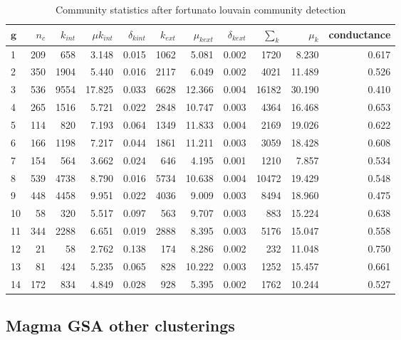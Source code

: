 \begin{table}[ht]
\centering
\begin{adjustbox}{max width=\textwidth}
\setlength{\extrarowheight}{2pt}
\begin{tabular}{lrrrrrrrrrr}
  \toprule
$\mathbf{g}$ & $n_c$ & $k_{int}$ & $\mu k_{int}$ & $\delta_{k int}$ & $k_{ext}$ & $\mu_{k ext}$ & $\delta_{k ext}$ & $\sum_k$ & $\mu_k$ & conductance \\ 
  \midrule
1 & 209 & 658 & 3.148 & 0.015 & 1062 & 5.081 & 0.002 & 1720 & 8.230 & 0.617 \\ 
  2 & 350 & 1904 & 5.440 & 0.016 & 2117 & 6.049 & 0.002 & 4021 & 11.489 & 0.526 \\ 
  3 & 536 & 9554 & 17.825 & 0.033 & 6628 & 12.366 & 0.004 & 16182 & 30.190 & 0.410 \\ 
  4 & 265 & 1516 & 5.721 & 0.022 & 2848 & 10.747 & 0.003 & 4364 & 16.468 & 0.653 \\ 
  5 & 114 & 820 & 7.193 & 0.064 & 1349 & 11.833 & 0.004 & 2169 & 19.026 & 0.622 \\ 
  6 & 166 & 1198 & 7.217 & 0.044 & 1861 & 11.211 & 0.003 & 3059 & 18.428 & 0.608 \\ 
  7 & 154 & 564 & 3.662 & 0.024 & 646 & 4.195 & 0.001 & 1210 & 7.857 & 0.534 \\ 
  8 & 539 & 4738 & 8.790 & 0.016 & 5734 & 10.638 & 0.004 & 10472 & 19.429 & 0.548 \\ 
  9 & 448 & 4458 & 9.951 & 0.022 & 4036 & 9.009 & 0.003 & 8494 & 18.960 & 0.475 \\ 
  10 & 58 & 320 & 5.517 & 0.097 & 563 & 9.707 & 0.003 & 883 & 15.224 & 0.638 \\ 
  11 & 344 & 2288 & 6.651 & 0.019 & 2888 & 8.395 & 0.003 & 5176 & 15.047 & 0.558 \\ 
  12 & 21 & 58 & 2.762 & 0.138 & 174 & 8.286 & 0.002 & 232 & 11.048 & 0.750 \\ 
  13 & 81 & 424 & 5.235 & 0.065 & 828 & 10.222 & 0.003 & 1252 & 15.457 & 0.661 \\ 
  14 & 172 & 834 & 4.849 & 0.028 & 928 & 5.395 & 0.002 & 1762 & 10.244 & 0.527 \\ 
   \bottomrule
\end{tabular}
\end{adjustbox}
\caption[Community statistics after Fortunato for Louvain community detection]{Community statistics after fortunato louvain community detection} 
\label{tab:Community statistics after fortunato louvain clustering}
\end{table}
\clearpage
\subsection{Magma GSA other clusterings}



